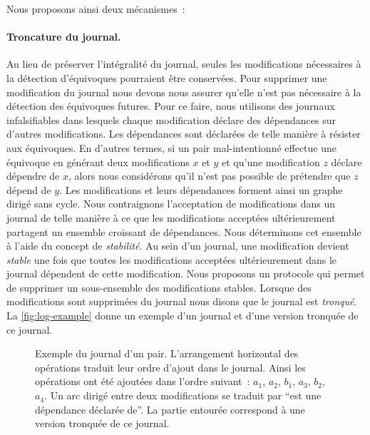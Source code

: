 Nous proposons ainsi deux mécanismes~:

\paragraph{Troncature du journal.} Au lieu de préserver l'intégralité du journal, seules les modifications nécessaires à la détection d'équivoques pourraient être conservées.
Pour supprimer une modification du journal nous devons nous assurer qu'elle n'est pas nécessaire à la détection des équivoques futures.
Pour ce faire, nous utilisons des journaux infalsifiables dans lesquels chaque modification déclare des dépendances sur d'autres modifications.
Les dépendances sont déclarées de telle manière à résister aux équivoques.
En d'autres termes, si un pair mal-intentionné effectue une équivoque en générant deux modifications $x$ et $y$ et qu'une modification $z$ déclare dépendre de $x$, alors nous considérons qu'il n'est pas possible de prétendre que $z$ dépend de $y$.
Les modifications et leurs dépendances forment ainsi un graphe dirigé sans cycle.
Nous contraignons l'acceptation de modifications dans un journal de telle manière à ce que les modifications acceptées ultérieurement partagent un ensemble croissant de dépendances.
Nous déterminons cet ensemble à l'aide du concept de \emph{stabilité}.
Au sein d'un journal, une modification devient \emph{stable} une fois que toutes les modifications acceptées ultérieurement dans le journal dépendent de cette modification.
Nous proposons un protocole qui permet de supprimer un sous-ensemble des modifications stables.
Lorsque des modifications sont supprimées du journal nous disons que le journal est \emph{tronqué}.
La \autoref{fig:log-example} donne un exemple d'un journal et d'une version tronquée de ce journal.

\begin{figure}[hbt]
\centering
{}
\caption[Exemple du journal d'un pair]{Exemple du journal d'un pair.
L'arrangement horizontal des opérations traduit leur ordre d'ajout dans le journal.
Ainsi les opérations ont été ajoutées dans l'ordre suivant~: $a_1$, $a_2$, $b_1$, $a_3$, $b_2$, $a_4$.
Un arc dirigé entre deux modifications se traduit par \enquote{est une dépendance déclarée de}.
La partie entourée correspond à une version tronquée de ce journal.
}\label{fig:log-example}
\end{figure}

